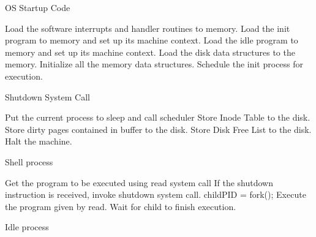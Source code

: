\begin{algorithm}
\caption{OS Startup Code}
\begin{algorithmic}
\STATE Load the software interrupts and handler routines to memory.
\STATE Load the init program to memory and set up its machine context.
\STATE Load the idle program to memory and set up its machine context.
\STATE Load the disk data structures to the memory.
\STATE Initialize all the memory data structures.
\STATE Schedule the init process for execution.
\end{algorithmic}
\end{algorithm}


\begin{algorithm}
\caption{Shutdown System Call}
\begin{algorithmic}
    \STATE Put the current process to sleep and call scheduler
\ENDWHILE
\STATE Store Inode Table to the disk.
\STATE Store dirty pages contained in buffer to the disk.     
\STATE Store Disk Free List to the disk.
\STATE Halt the machine.
\end{algorithmic}
\end{algorithm}


\begin{algorithm}
\caption{Shell process}
\begin{algorithmic}
    \STATE Get the program to be executed using read system call
    \STATE If the shutdown instruction is received, invoke shutdown system call.
    \STATE childPID = fork();
        \STATE Execute the program given by read.
    \ELSE 
        \STATE Wait for child to finish execution.
    \ENDIF
\ENDWHILE

\end{algorithmic}
\end{algorithm}


\begin{algorithm}
\caption{Idle process}
\begin{algorithmic}
\ENDWHILE
\end{algorithmic}
\end{algorithm}
